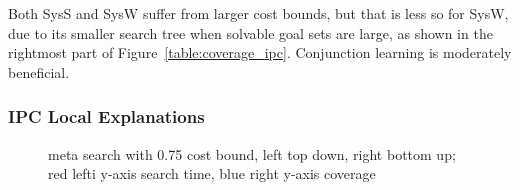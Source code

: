 Both SysS and SysW suffer from larger cost bounds, but that is less so
for SysW, due to its smaller search tree when solvable goal sets are
large, as shown in the rightmost part of
Figure~\ref{table:coverage_ipc}. Conjunction learning is moderately
beneficial.
%
%



\subsubsection{IPC Local Explanations}




\begin{figure}[ht]
%
\small
\centering
\begin{minipage}{0.22\textwidth}

\end{minipage}
\hfill
\begin{minipage}{0.22\textwidth}

\end{minipage}

	\caption{meta search with 0.75 cost bound, left top down, right bottom up; red lefti y-axis search time, blue right y-axis coverage }
\end{figure}

















